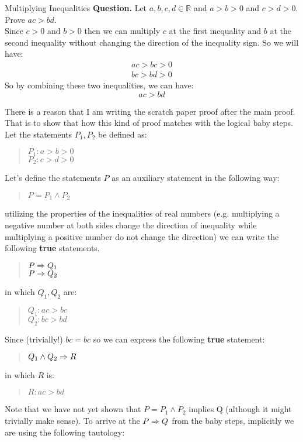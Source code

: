 \begin{example}{Multiplying Inequalities}
	\textbf{Question.} Let $ a,b,c,d \in \mathbb{R} $ and $ a > b > 0 $ and $ c > d > 0 $. Prove $ ac > bd $. \\
	
	 Since $ c > 0 $ and $ b > 0 $ then we can multiply $ c $ at the first inequality and $ b $ at the second inequality without changing the direction of the inequality sign. So we will have:
	\begin{align*}
		ac > bc > 0 \\
		bc > bd > 0
	\end{align*}
	So by combining these two inequalities, we can have:
	\[ ac > bd \]
	
	 There is a reason that I am writing the scratch paper proof after the main proof. That is to show that how this kind of proof matches with the logical baby steps. Let the statements $ P_1, P_2 $ be defined as:
	\begin{quote}
		\centering
		$ P_1: a>b>0 $ \\
		$ P_2: c>d>0 $
	\end{quote}
	Let's define the statements $ P $ as an auxiliary statement in the following way:
	\begin{quote}
		\centering
		$ P = P_1 \wedge P_2 $
	\end{quote} 
	utilizing the properties of the inequalities of real numbers (e.g. multiplying a negative number at both sides change the direction of inequality while multiplying a positive number do not change the direction) we can write the following \textbf{true} statements. 
	\begin{quote}
		\centering
		$ P \Rightarrow Q_1 $ \\
		$ P \Rightarrow Q_2 $ 
	\end{quote}
	in which $ Q_1, Q_2 $ are:
	\begin{quote}
		\centering
		$ Q_1: ac > bc $ \\
		$ Q_2: bc > bd $
	\end{quote}
	Since (trivially!) $ bc=bc $ so we can express the following \textbf{true} statement:
	\begin{quote}
		\centering
		$ Q_1 \wedge Q_2 \Rightarrow R $
	\end{quote}
	in which $ R $ is:
	\begin{quote}
		\centering
		$ R: ac>bd $
	\end{quote}
	Note that we have not yet shown that $ P = P_1 \wedge P_2 $ implies Q (although it might trivially make sense). To arrive at the $ P \Rightarrow Q $ from the baby steps, implicitly we are using the following tautology:

\end{example}
